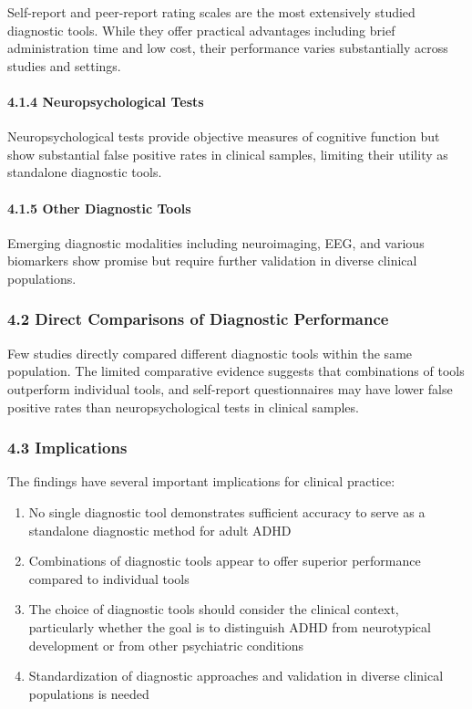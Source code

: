 \documentclass[
  12pt,
  letterpaper,
]{article}
\providecommand{\tightlist}{%
  \setlength{\itemsep}{0pt}\setlength{\parskip}{0pt}}
\renewcommand{\[}{\begin{singlespace}\oldDisplayMath}
\renewcommand{\]}{\endoldDisplayMath\end{singlespace}\vspace{\baselineskip}}
\begin{document}
Self-report and peer-report rating scales are the most extensively
studied diagnostic tools. While they offer practical advantages
including brief administration time and low cost, their performance
varies substantially across studies and settings.

\paragraph{4.1.4 Neuropsychological
Tests}\label{neuropsychological-tests}

Neuropsychological tests provide objective measures of cognitive
function but show substantial false positive rates in clinical samples,
limiting their utility as standalone diagnostic tools.

\paragraph{4.1.5 Other Diagnostic Tools}\label{other-diagnostic-tools}

Emerging diagnostic modalities including neuroimaging, EEG, and various
biomarkers show promise but require further validation in diverse
clinical populations.

\subsubsection{4.2 Direct Comparisons of Diagnostic
Performance}\label{direct-comparisons-of-diagnostic-performance}

Few studies directly compared different diagnostic tools within the same
population. The limited comparative evidence suggests that combinations
of tools outperform individual tools, and self-report questionnaires may
have lower false positive rates than neuropsychological tests in
clinical samples.

\subsubsection{4.3 Implications}\label{implications}

The findings have several important implications for clinical practice:

\begin{enumerate}
\def\labelenumi{\arabic{enumi}.}
\tightlist
\item
  No single diagnostic tool demonstrates sufficient accuracy to serve as
  a standalone diagnostic method for adult ADHD
\item
  Combinations of diagnostic tools appear to offer superior performance
  compared to individual tools
\item
  The choice of diagnostic tools should consider the clinical context,
  particularly whether the goal is to distinguish ADHD from neurotypical
  development or from other psychiatric conditions
\item
  Standardization of diagnostic approaches and validation in diverse
  clinical populations is needed
\end{enumerate}
\end{document}
